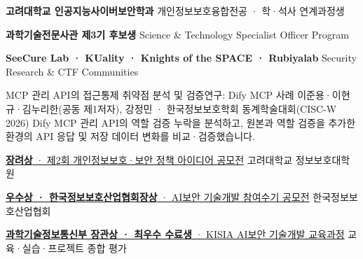 \def\cvpdftitle{hy30nq | 보안 연구 CV}
\def\cvfooterlabel{hy30nq · 보안 연구 CV}
\def\cvupdated{2026년 10월 업데이트}



\sffamily



  {\textbf{고려대학교 인공지능사이버보안학과}}
  {개인정보보호융합전공 · 학·석사 연계과정생}

  {\textbf{과학기술전문사관 제3기 후보생}}
  {Science \& Technology Specialist Officer Program}

\compactentry{}
  {\textbf{SeeCure Lab · KUality · Knights of the SPACE · Rubiyalab}}
  {Security Research \& CTF Communities}


  {MCP 관리 API의 접근통제 취약점 분석 및 검증연구: Dify MCP 사례}
  {이준용·이현규·김누리한(공동 제1저자), 강정민 · 한국정보보호학회 동계학술대회(CISC-W 2026)}
  {Dify MCP 관리 API의 역할 검증 누락을 분석하고, 원본과 역할 검증을 추가한 환경의 API 응답 및 저장 데이터 변화를 비교·검증했습니다.}


  {\href{https://security.korea.ac.kr/m06_04/59}{\textbf{장려상} · 제2회 개인정보보호·보안 정책 아이디어 공모전}}
  {고려대학교 정보보호대학원}

  {\href{https://blog.naver.com/kisiaedu/223785868393}{\textbf{우수상 · 한국정보보호산업협회장상} · AI보안 기술개발 참여수기 공모전}}
  {한국정보보호산업협회}

  {\href{https://www.kisia.or.kr/talent_support/education_business/ai_security_technology_development/}{\textbf{과학기술정보통신부 장관상 · 최우수 수료생} · KISIA AI보안 기술개발 교육과정}}
  {교육·실습·프로젝트 종합 평가}

